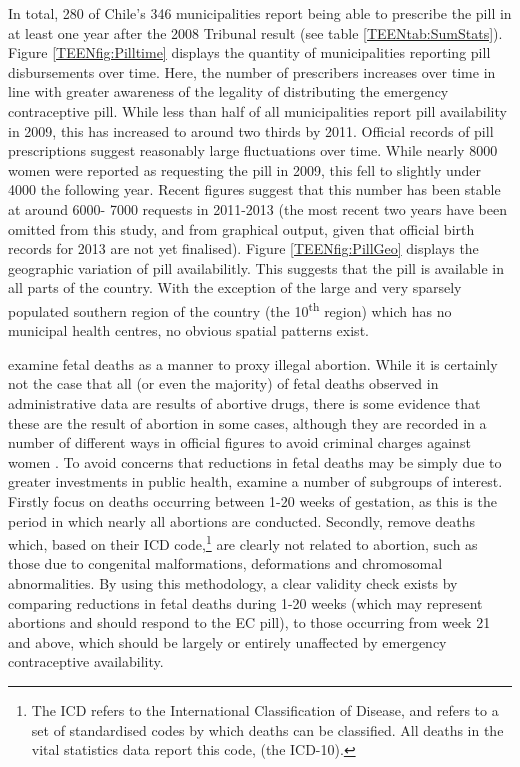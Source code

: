In total, 280 of Chile's 346 municipalities report being able to prescribe the 
pill in at least one year after the 2008 Tribunal result (see table 
\ref{TEENtab:SumStats}). Figure \ref{TEENfig:Pilltime} displays the quantity
of municipalities reporting pill disbursements over time.  Here, the number
of prescribers increases over time in line with greater awareness of the legality 
of distributing the emergency contraceptive pill.  While less than half of all
municipalities report pill availability in 2009, this has increased to around
two thirds by 2011.  Official records of pill prescriptions suggest reasonably
large fluctuations over time.  While nearly 8000 women were reported as 
requesting the pill in 2009, this fell to slightly under 4000 the following
year.  Recent figures suggest that this number has been stable at around 6000-%
7000 requests in 2011-2013 (the most recent two years have been omitted from
this study, and from graphical output, given that official birth records for
2013 are not yet finalised).  Figure \ref{TEENfig:PillGeo} displays
the geographic variation of pill availabilitly.  This suggests that the pill
is available in all parts of the country. With the exception of the large and 
very sparsely populated southern region of the country (the 
10\textsuperscript{th} region) which has no municipal health centres, no 
obvious spatial patterns exist.

\Person examine fetal deaths as a manner to proxy illegal abortion.  While it 
is certainly not the case that all (or even the majority) of fetal deaths 
observed in administrative data are results of abortive drugs, there is some
evidence that these are the result of abortion in some cases, although they are 
recorded in a number of different ways in official figures to avoid criminal 
charges against women \citep{ShepardCasas2007}.  To avoid concerns that 
reductions in fetal deaths may be simply due to greater investments in public
health, \person examine a number of subgroups of interest.  Firstly \person focus 
on deaths occurring between 1-20 weeks of gestation, as this is the period in 
which nearly all abortions are conducted.  Secondly, \person remove deaths which,
based on their ICD code,\footnote{The ICD refers to the International 
Classification of Disease, and refers to a set of standardised codes by which
deaths can be classified.  All deaths in the vital statistics data report this 
code, (the ICD-10).} are clearly not related to abortion, such as those due to 
congenital malformations, deformations and chromosomal abnormalities.  By
using this methodology, a clear validity check exists by comparing reductions
in fetal deaths during 1-20 weeks (which may represent abortions and should
respond to the EC pill), to those occurring from week 21 and above,
which should be largely or entirely unaffected by emergency contraceptive
availability.

